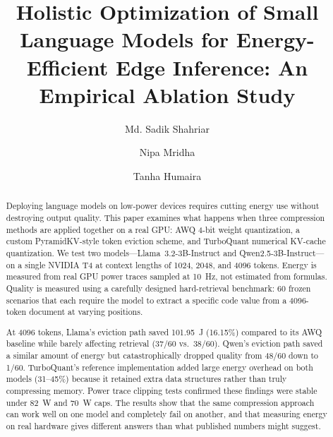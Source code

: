 \documentclass[sigconf,nonacm]{acmart}
\begin{document}
\title{Holistic Optimization of Small Language Models for Energy-Efficient Edge Inference: An Empirical Ablation Study}

\author{Md. Sadik Shahriar}

\author{Nipa Mridha}

\author{Tanha Humaira}

\renewcommand{\shortauthors}{Shahriar, Mridha, and Humaira}

\begin{abstract}
Deploying language models on low-power devices requires cutting energy use without
destroying output quality. This paper examines what happens when three compression
methods are applied together on a real GPU: AWQ 4-bit weight quantization, a
custom PyramidKV-style token eviction scheme, and TurboQuant numerical KV-cache
quantization. We test two models---Llama~3.2-3B-Instruct and Qwen2.5-3B-Instruct---on
a single NVIDIA T4 at context lengths of 1024, 2048, and 4096 tokens. Energy is
measured from real GPU power traces sampled at 10~Hz, not estimated from formulas.
Quality is measured using a carefully designed hard-retrieval benchmark: 60 frozen
scenarios that each require the model to extract a specific code value from a
4096-token document at varying positions.

At 4096 tokens, Llama's eviction path saved 101.95~J (16.15\%) compared to its
AWQ baseline while barely affecting retrieval (37/60 vs.\ 38/60). Qwen's eviction
path saved a similar amount of energy but catastrophically dropped quality from
48/60 down to 1/60. TurboQuant's reference implementation added large energy
overhead on both models (31--45\%) because it retained extra data structures
rather than truly compressing memory. Power trace clipping tests confirmed these
findings were stable under 82~W and 70~W caps. The results show that the same
compression approach can work well on one model and completely fail on another,
and that measuring energy on real hardware gives different answers than what
published numbers might suggest.
\end{abstract}
\end{document}
